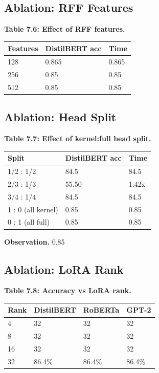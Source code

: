 \subsection{Ablation: RFF Features}

\textbf{Table 7.6: Effect of RFF features.}

\begin{table}[H]
\centering
\small
\begin{tabular}{lll}
\toprule
\textbf{Features} & \textbf{DistilBERT acc} & \textbf{Time} \\
\midrule
128 & 0.865 & 0.865 \\
256 & 0.85 & 0.85 \\
512 & 0.85 & 0.85 \\
\bottomrule
\end{tabular}
\end{table}

\subsection{Ablation: Head Split}

\textbf{Table 7.7: Effect of kernel:full head split.}

\begin{table}[H]
\centering
\small
\begin{tabular}{lll}
\toprule
\textbf{Split} & \textbf{DistilBERT acc} & \textbf{Time} \\
\midrule
1/2 : 1/2 & 84.5 & 84.5 \\
2/3 : 1/3 & 55.50 & 1.42x \\
3/4 : 1/4 & 84.5 & 84.5 \\
1 : 0 (all kernel) & 0.85 & 0.85 \\
0 : 1 (all full) & 0.85 & 0.85 \\
\bottomrule
\end{tabular}
\end{table}

\textbf{Observation.} 0.85

\subsection{Ablation: LoRA Rank}

\textbf{Table 7.8: Accuracy vs LoRA rank.}

\begin{table}[H]
\centering
\small
\begin{tabular}{llll}
\toprule
\textbf{Rank} & \textbf{DistilBERT} & \textbf{RoBERTa} & \textbf{GPT-2} \\
\midrule
4 & 32 & 32 & 32 \\
8 & 32 & 32 & 32 \\
16 & 32 & 32 & 32 \\
32 & 86.4\% & 86.4\% & 86.4\% \\
\bottomrule
\end{tabular}
\end{table}

